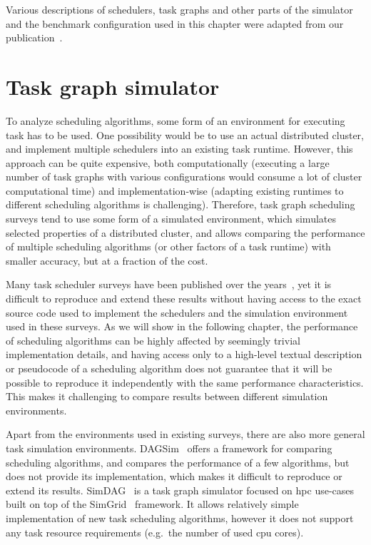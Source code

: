 Various descriptions of schedulers, task graphs and other parts of the simulator and the benchmark
configuration used in this chapter were adapted from our publication~\cite{estee}.


\section{Task graph simulator}
\label{sec:estee-simulator}
To analyze scheduling algorithms, some form of an environment for executing task has to be used.
One possibility would be to use an actual distributed cluster, and implement multiple schedulers
into an existing task runtime. However, this approach can be quite expensive, both computationally
(executing a large number of task graphs with various configurations would consume a lot of cluster
computational time) and implementation-wise (adapting existing runtimes to different scheduling
algorithms is challenging). Therefore, task graph scheduling surveys tend to use some form of a
simulated environment, which simulates selected properties of a distributed cluster, and allows
comparing the performance of multiple scheduling algorithms (or other factors of a task runtime)
with smaller accuracy, but at a fraction of the  cost.

Many task scheduler surveys have been published over the years~\cite{hlfet1974, kwok1998benchmarking, hagras2003static, sinnen2005, wang2018list}, yet it is
difficult to reproduce and extend these results without having access to the exact source code used
to implement the schedulers and the simulation environment used in these surveys. As we will show
in the following chapter, the performance of scheduling algorithms can be highly affected by
seemingly trivial implementation details, and having access only to a high-level textual
description or pseudocode of a scheduling algorithm does not guarantee that it will be possible to
reproduce it independently with the same performance characteristics. This makes it challenging to
compare results between different simulation environments.

Apart from the environments used in existing surveys, there are also more general task simulation
environments. DAGSim~\cite{dagsim} offers a framework for comparing scheduling
algorithms, and compares the performance of a few algorithms, but does not provide its
implementation, which makes it difficult to reproduce or extend its results.
SimDAG~\cite{simdag} is a task graph simulator focused on \gls{hpc}
use-cases built on top of the SimGrid~\cite{simgrid} framework. It allows relatively
simple implementation of new task scheduling algorithms, however it does not support any task
resource requirements (e.g.\ the number of used \gls{cpu} cores).

